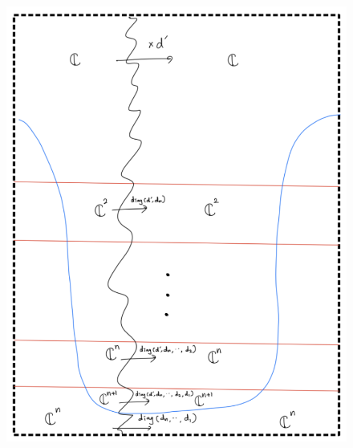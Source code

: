 \begin{enumerate}[label = (\roman*)]
\begin{enumerate}[label = (Step \arabic*)]
\begin{figure}[H]
    \centering
    \includegraphics[scale = 0.95]{diagrams/cobord5/7.png}
    \caption{}
    \label{fig:your-label}
\end{figure}
\end{enumerate}
\end{enumerate}
\pagebreak